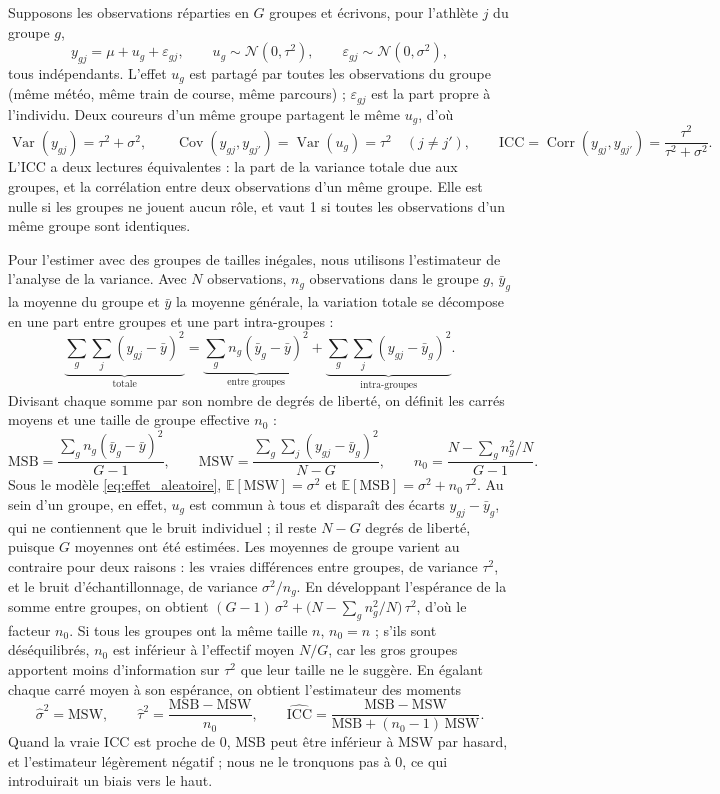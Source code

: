 \documentclass[11pt,a4paper]{article}
\newcommand{\E}{\mathbb{E}}
\DeclareMathOperator{\Var}{Var}
\DeclareMathOperator{\Cov}{Cov}
\DeclareMathOperator{\Corr}{Corr}
\begin{document}
Supposons les observations réparties en $G$ groupes et écrivons, pour l'athlète $j$ du groupe $g$,
\begin{equation}\label{eq:effet_aleatoire}
y_{gj} = \mu + u_g + \varepsilon_{gj}, \qquad u_g \sim \mathcal{N}(0, \tau^2), \qquad
\varepsilon_{gj} \sim \mathcal{N}(0, \sigma^2),
\end{equation}
tous indépendants. L'effet $u_g$ est partagé par toutes les observations du groupe (même météo, même train de course,
même parcours) ; $\varepsilon_{gj}$ est la part propre à l'individu. Deux coureurs d'un même groupe partagent le même
$u_g$, d'où
\[
\Var(y_{gj}) = \tau^2 + \sigma^2, \qquad \Cov(y_{gj}, y_{gj'}) = \Var(u_g) = \tau^2 \quad (j \neq j'), \qquad
\mathrm{ICC} = \Corr(y_{gj}, y_{gj'}) = \frac{\tau^2}{\tau^2 + \sigma^2} .
\]
L'ICC a deux lectures équivalentes : la part de la variance totale due aux groupes, et la corrélation entre deux
observations d'un même groupe. Elle est nulle si les groupes ne jouent aucun rôle, et vaut 1 si toutes les
observations d'un même groupe sont identiques.

Pour l'estimer avec des groupes de tailles inégales, nous utilisons l'estimateur de l'analyse de la variance. Avec
$N$ observations, $n_g$ observations dans le groupe $g$, $\bar y_g$ la moyenne du groupe et $\bar y$ la moyenne
générale, la variation totale se décompose en une part entre groupes et une part intra-groupes :
\[
\underbrace{\sum_g\sum_j(y_{gj}-\bar y)^2}_{\text{totale}}
= \underbrace{\sum_g n_g(\bar y_g-\bar y)^2}_{\text{entre groupes}}
+ \underbrace{\sum_g\sum_j(y_{gj}-\bar y_g)^2}_{\text{intra-groupes}} .
\]
Divisant chaque somme par son nombre de degrés de liberté, on définit les carrés moyens et une taille de groupe
effective $n_0$ :
\[
\mathrm{MSB} = \frac{\sum_g n_g(\bar y_g - \bar y)^2}{G-1},\qquad
\mathrm{MSW} = \frac{\sum_g\sum_j (y_{gj} - \bar y_g)^2}{N-G},\qquad
n_0 = \frac{N - \sum_g n_g^2/N}{G-1} .
\]
Sous le modèle \eqref{eq:effet_aleatoire}, $\E[\mathrm{MSW}] = \sigma^2$ et $\E[\mathrm{MSB}] = \sigma^2 + n_0\,\tau^2$.
Au sein d'un groupe, en effet, $u_g$ est commun à tous et disparaît des écarts $y_{gj} - \bar y_g$, qui ne contiennent
que le bruit individuel ; il reste $N - G$ degrés de liberté, puisque $G$ moyennes ont été estimées. Les moyennes de
groupe varient au contraire pour deux raisons : les vraies différences entre groupes, de variance $\tau^2$, et le
bruit d'échantillonnage, de variance $\sigma^2/n_g$. En développant l'espérance de la somme entre groupes, on obtient
$(G - 1)\,\sigma^2 + \big(N - \sum_g n_g^2/N\big)\,\tau^2$, d'où le facteur $n_0$. Si tous les groupes ont la même
taille $n$, $n_0 = n$ ; s'ils sont déséquilibrés, $n_0$ est inférieur à l'effectif moyen $N/G$, car les gros groupes
apportent moins d'information sur $\tau^2$ que leur taille ne le suggère. En égalant chaque carré moyen à son
espérance, on obtient l'estimateur des moments
\[
\hat\sigma^2 = \mathrm{MSW}, \qquad \hat\tau^2 = \frac{\mathrm{MSB}-\mathrm{MSW}}{n_0}, \qquad
\widehat{\mathrm{ICC}} = \frac{\mathrm{MSB} - \mathrm{MSW}}{\mathrm{MSB} + (n_0 - 1)\,\mathrm{MSW}} .
\]
Quand la vraie ICC est proche de 0, MSB peut être inférieur à MSW par hasard, et l'estimateur légèrement négatif ; nous
ne le tronquons pas à 0, ce qui introduirait un biais vers le haut.
\end{document}
